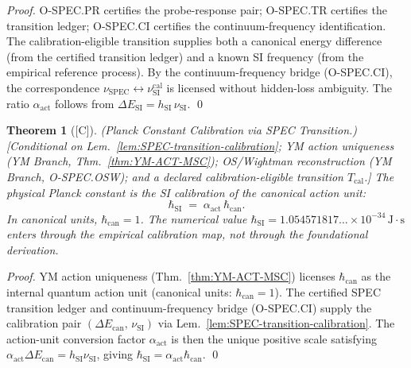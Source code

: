 \documentclass[12pt,oneside]{amsbook}
\theoremstyle{plain}
\newtheorem{theorem}{Theorem}[section]
\theoremstyle{definition}
\theoremstyle{remark}
\newcommand{\status}[1]{\textup{[#1]}}
\begin{document}
\begin{proof}
O-SPEC.PR certifies the probe-response pair; O-SPEC.TR certifies
the transition ledger; O-SPEC.CI certifies the continuum-frequency
identification. The calibration-eligible transition supplies both
a canonical energy difference (from the certified transition ledger)
and a known SI frequency (from the empirical reference process).
By the continuum-frequency bridge (O-SPEC.CI), the correspondence
$\nu_{\mathrm{SPEC}} \leftrightarrow \nu_{\mathrm{SI}}^{\mathrm{cal}}$
is licensed without hidden-loss ambiguity. The ratio $\alpha_{\mathrm{act}}$
follows from $\Delta E_{\mathrm{SI}} = h_{\mathrm{SI}}\,\nu_{\mathrm{SI}}$.
\qed
\end{proof}

\begin{theorem}[\status{C}]\label{thm:SPEC-Planck-calibration}
\textup{(Planck Constant Calibration via SPEC Transition.)}
\textup{[Conditional on Lem.~\ref{lem:SPEC-transition-calibration};
YM action uniqueness (YM Branch, Thm.~\ref{thm:YM-ACT-MSC});
OS/Wightman reconstruction (YM Branch, O-SPEC.OSW); and a declared
calibration-eligible transition $T_{\mathrm{cal}}$.]}
The physical Planck constant is the SI calibration of the canonical
action unit:
\[
 \hbar_{\mathrm{SI}} \;=\; \alpha_{\mathrm{act}}\,\hbar_{\mathrm{can}}.
\]
In canonical units, $\hbar_{\mathrm{can}}=1$. The numerical value
$\hbar_{\mathrm{SI}} = 1.054571817\ldots\times10^{-34}\,\mathrm{J\cdot s}$
enters through the empirical calibration map, not through the
foundational derivation.
\end{theorem}

\begin{proof}
YM action uniqueness (Thm.~\ref{thm:YM-ACT-MSC}) licenses
$\hbar_{\mathrm{can}}$ as the internal quantum action unit
(canonical units: $\hbar_{\mathrm{can}}=1$). The certified SPEC
transition ledger and continuum-frequency bridge (O-SPEC.CI) supply the
calibration pair $(\Delta E_{\mathrm{can}},\,\nu_{\mathrm{SI}})$
via Lem.~\ref{lem:SPEC-transition-calibration}. The action-unit
conversion factor $\alpha_{\mathrm{act}}$ is then the unique positive
scale satisfying
$\alpha_{\mathrm{act}}\Delta E_{\mathrm{can}} = h_{\mathrm{SI}}\nu_{\mathrm{SI}}$,
giving $\hbar_{\mathrm{SI}} = \alpha_{\mathrm{act}}\hbar_{\mathrm{can}}$.
\qed
\end{proof}
\end{document}
